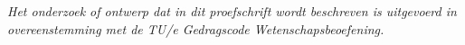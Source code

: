 \begin{titlepage}
{\vfill
\noindent 
\textit{
    Het onderzoek of ontwerp dat in dit proefschrift wordt beschreven is uitgevoerd in 
    overeenstemming met de TU/e Gedragscode Wetenschapsbeoefening.
}

}

\end{titlepage}